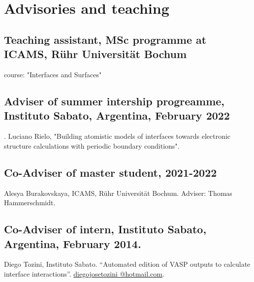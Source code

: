 \section{Advisories and teaching}

\subsection{Teaching assistant, MSc programme at ICAMS, Rühr Universität Bochum} course: "Interfaces and Surfaces"

\subsection{Adviser of summer intership progreamme, Instituto Sabato, Argentina, February 2022}. Luciano Rielo,
"Building atomistic models of interfaces towards electronic structure calculations with periodic boundary conditions".  

\subsection{Co-Adviser of master student, 2021-2022} Alesya Burakovskaya, ICAMS, Rühr Universität Bochum.
Adviser: Thomas Hammerschmidt.

\subsection{Co-Adviser of intern, Instituto Sabato, Argentina, February 2014.} Diego Tozini, Instituto Sabato. “Automated edition
of VASP outputs to calculate interface interactions”. \href{mailto:diegojosetozini@hotmail.com}{diegojosetozini @hotmail.com}.

